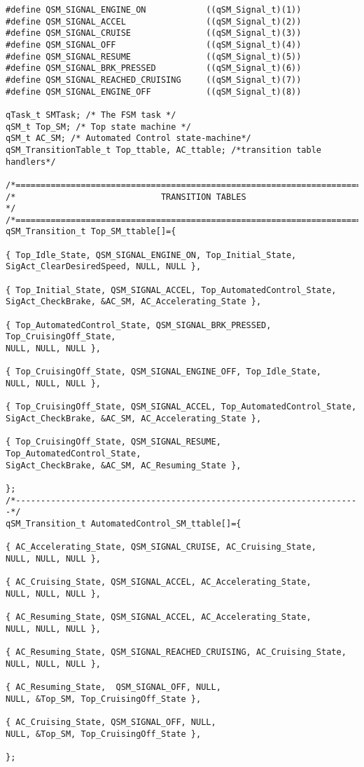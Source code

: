 \begin{lstlisting}[style=CStyle]
#define QSM_SIGNAL_ENGINE_ON            ((qSM_Signal_t)(1))
#define QSM_SIGNAL_ACCEL                ((qSM_Signal_t)(2))
#define QSM_SIGNAL_CRUISE               ((qSM_Signal_t)(3))
#define QSM_SIGNAL_OFF                  ((qSM_Signal_t)(4))
#define QSM_SIGNAL_RESUME               ((qSM_Signal_t)(5))
#define QSM_SIGNAL_BRK_PRESSED          ((qSM_Signal_t)(6))
#define QSM_SIGNAL_REACHED_CRUISING     ((qSM_Signal_t)(7))
#define QSM_SIGNAL_ENGINE_OFF           ((qSM_Signal_t)(8))

qTask_t SMTask; /* The FSM task */
qSM_t Top_SM; /* Top state machine */
qSM_t AC_SM; /* Automated Control state-machine*/
qSM_TransitionTable_t Top_ttable, AC_ttable; /*transition table handlers*/

/*=======================================================================*/
/*                             TRANSITION TABLES                         */
/*=======================================================================*/
qSM_Transition_t Top_SM_ttable[]={

{ Top_Idle_State, QSM_SIGNAL_ENGINE_ON, Top_Initial_State,  
SigAct_ClearDesiredSpeed, NULL, NULL },

{ Top_Initial_State, QSM_SIGNAL_ACCEL, Top_AutomatedControl_State, 
SigAct_CheckBrake, &AC_SM, AC_Accelerating_State },

{ Top_AutomatedControl_State, QSM_SIGNAL_BRK_PRESSED, Top_CruisingOff_State, 
NULL, NULL, NULL },

{ Top_CruisingOff_State, QSM_SIGNAL_ENGINE_OFF, Top_Idle_State, 
NULL, NULL, NULL },

{ Top_CruisingOff_State, QSM_SIGNAL_ACCEL, Top_AutomatedControl_State, 
SigAct_CheckBrake, &AC_SM, AC_Accelerating_State },

{ Top_CruisingOff_State, QSM_SIGNAL_RESUME, Top_AutomatedControl_State, 
SigAct_CheckBrake, &AC_SM, AC_Resuming_State },

};
/*---------------------------------------------------------------------*/
qSM_Transition_t AutomatedControl_SM_ttable[]={

{ AC_Accelerating_State, QSM_SIGNAL_CRUISE, AC_Cruising_State,
NULL, NULL, NULL },

{ AC_Cruising_State, QSM_SIGNAL_ACCEL, AC_Accelerating_State,
NULL, NULL, NULL },

{ AC_Resuming_State, QSM_SIGNAL_ACCEL, AC_Accelerating_State, 
NULL, NULL, NULL },

{ AC_Resuming_State, QSM_SIGNAL_REACHED_CRUISING, AC_Cruising_State,
NULL, NULL, NULL },

{ AC_Resuming_State,  QSM_SIGNAL_OFF, NULL,  
NULL, &Top_SM, Top_CruisingOff_State },    

{ AC_Cruising_State, QSM_SIGNAL_OFF, NULL, 
NULL, &Top_SM, Top_CruisingOff_State },    

};
\end{lstlisting}

